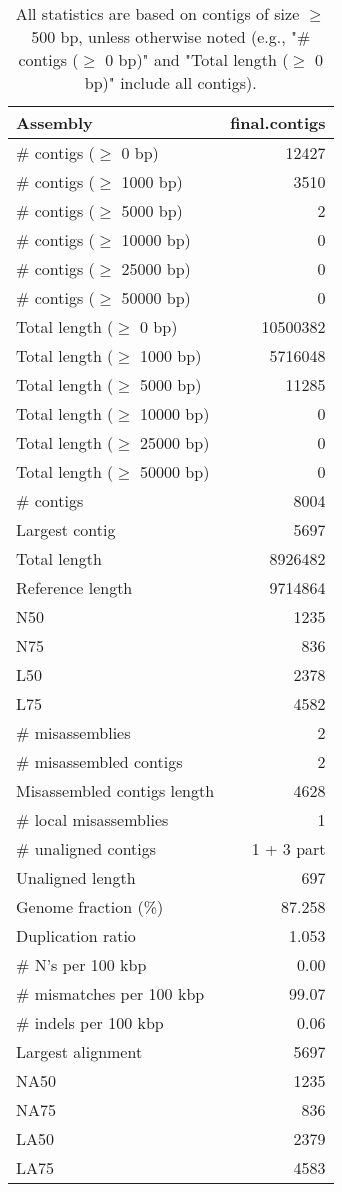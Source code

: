 \documentclass[12pt,a4paper]{article}
\begin{document}
\begin{table}[ht]
\begin{center}
\caption{All statistics are based on contigs of size $\geq$ 500 bp, unless otherwise noted (e.g., "\# contigs ($\geq$ 0 bp)" and "Total length ($\geq$ 0 bp)" include all contigs).}
\begin{tabular}{|l*{1}{|r}|}
\hline
Assembly & final.contigs \\ \hline
\# contigs ($\geq$ 0 bp) & 12427 \\ \hline
\# contigs ($\geq$ 1000 bp) & 3510 \\ \hline
\# contigs ($\geq$ 5000 bp) & 2 \\ \hline
\# contigs ($\geq$ 10000 bp) & 0 \\ \hline
\# contigs ($\geq$ 25000 bp) & 0 \\ \hline
\# contigs ($\geq$ 50000 bp) & 0 \\ \hline
Total length ($\geq$ 0 bp) & 10500382 \\ \hline
Total length ($\geq$ 1000 bp) & 5716048 \\ \hline
Total length ($\geq$ 5000 bp) & 11285 \\ \hline
Total length ($\geq$ 10000 bp) & 0 \\ \hline
Total length ($\geq$ 25000 bp) & 0 \\ \hline
Total length ($\geq$ 50000 bp) & 0 \\ \hline
\# contigs & 8004 \\ \hline
Largest contig & 5697 \\ \hline
Total length & 8926482 \\ \hline
Reference length & 9714864 \\ \hline
N50 & 1235 \\ \hline
N75 & 836 \\ \hline
L50 & 2378 \\ \hline
L75 & 4582 \\ \hline
\# misassemblies & 2 \\ \hline
\# misassembled contigs & 2 \\ \hline
Misassembled contigs length & 4628 \\ \hline
\# local misassemblies & 1 \\ \hline
\# unaligned contigs & 1 + 3 part \\ \hline
Unaligned length & 697 \\ \hline
Genome fraction (\%) & 87.258 \\ \hline
Duplication ratio & 1.053 \\ \hline
\# N's per 100 kbp & 0.00 \\ \hline
\# mismatches per 100 kbp & 99.07 \\ \hline
\# indels per 100 kbp & 0.06 \\ \hline
Largest alignment & 5697 \\ \hline
NA50 & 1235 \\ \hline
NA75 & 836 \\ \hline
LA50 & 2379 \\ \hline
LA75 & 4583 \\ \hline
\end{tabular}
\end{center}
\end{table}
\end{document}
